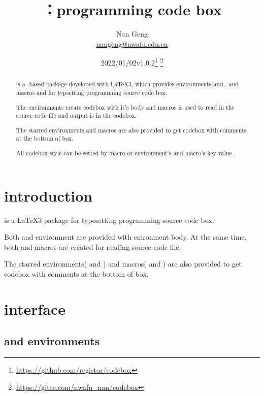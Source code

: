 \documentclass{ctxdoc-en}
\title{\bfseries\pkg{codebox}：programming code box}
\author{Nan Geng\\ \url{nangeng@nwafu.edu.cn}}
\date{2022/01/02\qquad v1.0.2\thanks{\url{https://github.com/registor/codebox}}
\thanks{\url{https://gitee.com/nwafu_nan/codebox}}}
\begin{document}
\maketitle

\begin{abstract}

 is a -based package developed with \LaTeX3,
which provides environments  and , and macros
 and  for typsetting programming source code box.

The environments create codebox with it's body and
macros is used to read in the source code file and output is in the codebox.

The starred environments and macros are also provided
to get codebox with comments at the bottom of box.

All codebox style can be setted by  macro
or environment's and macro's key-value .

\end{abstract}

\tableofcontents

\section{introduction}

 is a \LaTeX3 package for typesetting programming source code box.

Both  and  environment are provided with enironment body.
At the same time, both  and  macros are created
for reading source code file.

The starred environments( and ) and
macros( and ) are also provided
to get codebox with comments at the bottom of box.

\section{interface}

\subsection{ and  environments}
\end{document}

